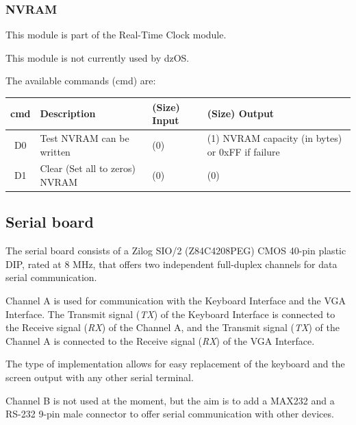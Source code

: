 \documentclass[a4paper,11pt]{article}
\begin{document}
     \subsubsection{NVRAM}
 
     This module is part of the Real-Time Clock module.

     This module is not currently used by dzOS.
 
     The available commands (cmd) are:
 
     \begin{tabular}{| c | m{3.8cm} | m{3cm} | m{3.5cm} | }
         \hline
         \rowcolor{lightgray}
         cmd & Description & (Size) Input & (Size) Output\\
         \hline
         D0 & Test  NVRAM can be written & (0) & (1) NVRAM capacity (in bytes) or 0xFF if failure\\
         \hline
         D1 & Clear (Set all to zeros) NVRAM & (0) & (0) \\
         \hline
     \end{tabular}


    \subsection{Serial board}

    The serial board consists of a Zilog SIO/2 (Z84C4208PEG) CMOS 40-pin plastic
    DIP, rated at 8 MHz, that offers two independent full-duplex channels for
    data serial communication.

    Channel A is used for communication with the Keyboard Interface and the VGA
    Interface. The Transmit signal (\textit{TX}) of the Keyboard Interface is
    connected to the Receive signal (\textit{RX}) of the Channel A, and the 
    Transmit signal (\textit{TX}) of the Channel A is connected to the Receive
    signal (\textit{RX}) of the VGA Interface.

    The type of implementation allows for easy replacement of the keyboard and
    the screen output with any other serial terminal.

    Channel B is not used at the moment, but the aim is to add a MAX232 and a 
    RS-232 9-pin male connector to offer serial communication with other
    devices.
\end{document}
